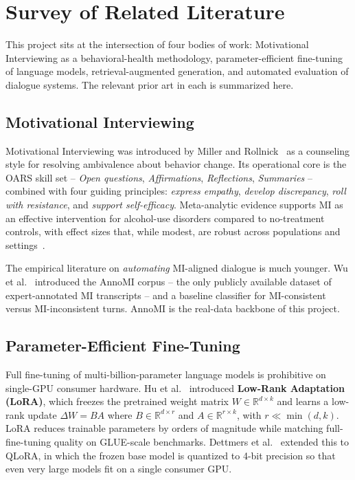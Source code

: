 \section{Survey of Related Literature}
\label{sec:literature}

This project sits at the intersection of four bodies of work: Motivational
Interviewing as a behavioral-health methodology, parameter-efficient fine-tuning
of language models, retrieval-augmented generation, and automated evaluation
of dialogue systems. The relevant prior art in each is summarized here.

\subsection{Motivational Interviewing}

Motivational Interviewing was introduced by Miller and Rollnick~\cite{miller2013mi}
as a counseling style for resolving ambivalence about behavior change. Its
operational core is the OARS skill set --
\textit{Open questions}, \textit{Affirmations}, \textit{Reflections},
\textit{Summaries} -- combined with four guiding principles:
\textit{express empathy}, \textit{develop discrepancy}, \textit{roll with
resistance}, and \textit{support self-efficacy}. Meta-analytic evidence supports
MI as an effective intervention for alcohol-use disorders compared to no-treatment
controls, with effect sizes that, while modest, are robust across populations
and settings~\cite{lundahl2010metaanalysis}.

The empirical literature on \emph{automating} MI-aligned dialogue is much
younger. Wu et al.~\cite{wu2022annomi} introduced the AnnoMI corpus -- the only
publicly available dataset of expert-annotated MI transcripts -- and a baseline
classifier for MI-consistent versus MI-inconsistent turns. AnnoMI is the
real-data backbone of this project.

\subsection{Parameter-Efficient Fine-Tuning}

Full fine-tuning of multi-billion-parameter language models is prohibitive on
single-GPU consumer hardware. Hu et al.~\cite{hu2022lora} introduced
\textbf{Low-Rank Adaptation (LoRA)}, which freezes the pretrained weight matrix
$W \in \mathbb{R}^{d \times k}$ and learns a low-rank update
$\Delta W = BA$ where $B \in \mathbb{R}^{d \times r}$ and
$A \in \mathbb{R}^{r \times k}$, with $r \ll \min(d,k)$. LoRA reduces trainable
parameters by orders of magnitude while matching full-fine-tuning quality on
GLUE-scale benchmarks. Dettmers et al.~\cite{dettmers2023qlora} extended this
to QLoRA, in which the frozen base model is quantized to 4-bit precision so that
even very large models fit on a single consumer GPU.

